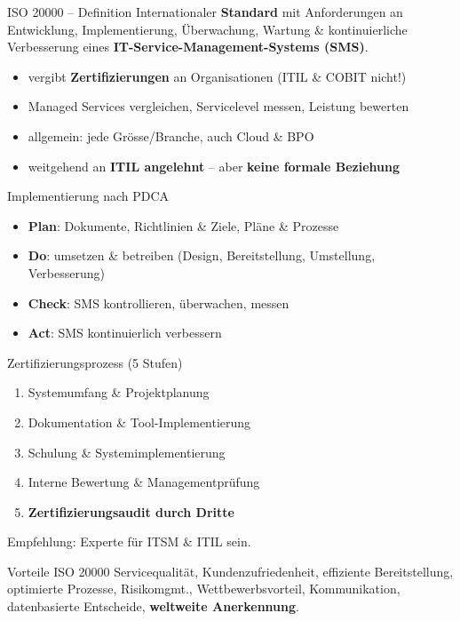 \documentclass[a4paper, fontsize=7pt]{scrartcl}
\begin{document}
\begin{mainbox}{ISO 20000 -- Definition}
Internationaler \textbf{Standard} mit Anforderungen an Entwicklung,
Implementierung, Überwachung, Wartung \& kontinuierliche Verbesserung eines
\textbf{IT-Service-Management-Systems (SMS)}.
\begin{itemize}
    \item vergibt \textbf{Zertifizierungen} an Organisationen (ITIL \&
          COBIT nicht!)
    \item Managed Services vergleichen, Servicelevel messen, Leistung
          bewerten
    \item allgemein: jede Grösse/Branche, auch Cloud \& BPO
    \item weitgehend an \textbf{ITIL angelehnt} -- aber \textbf{keine
          formale Beziehung}
\end{itemize}
\end{mainbox}

\begin{mainbox}{Implementierung nach PDCA}
\begin{itemize}
    \item \textbf{Plan}: Dokumente, Richtlinien \& Ziele, Pläne \& Prozesse
    \item \textbf{Do}: umsetzen \& betreiben (Design, Bereitstellung,
          Umstellung, Verbesserung)
    \item \textbf{Check}: SMS kontrollieren, überwachen, messen
    \item \textbf{Act}: SMS kontinuierlich verbessern
\end{itemize}
\end{mainbox}

\begin{mainbox}{Zertifizierungsprozess (5 Stufen)}
\begin{enumerate}
    \item Systemumfang \& Projektplanung
    \item Dokumentation \& Tool-Implementierung
    \item Schulung \& Systemimplementierung
    \item Interne Bewertung \& Managementprüfung
    \item \textbf{Zertifizierungsaudit durch Dritte}
\end{enumerate}
Empfehlung: Experte für ITSM \& ITIL sein.
\end{mainbox}

\begin{subbox}{Vorteile ISO 20000}
Servicequalität, Kundenzufriedenheit, effiziente Bereitstellung,
optimierte Prozesse, Risikomgmt., Wettbewerbsvorteil, Kommunikation,
datenbasierte Entscheide, \textbf{weltweite Anerkennung}.
\end{subbox}
\end{document}
